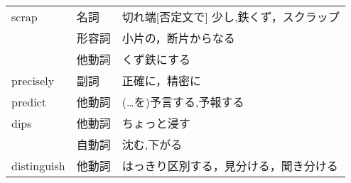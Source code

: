 \documentclass[fleqn,9pt,a4paper,dvipdfmx]{jsarticle}
\begin{document}
\begin{enumerate}
\begin{table}[h]
\begin{tabular}{l|ll}
  scrap                      & 名詞                             & 切れ端{[}否定文で{]} 少し,鉄くず，スクラップ     \\
                             & 形容詞                            & 小片の，断片からなる                    \\
                             & 他動詞                            & くず鉄にする                        \\ \hline
  precisely                  & 副詞                             & 正確に，精密に                        \\ \hline
  predict                    & 他動詞                            & (…を)予言する,予報する                  \\ \hline
  dips                       & 他動詞                            & ちょっと浸す                        \\
                             & 自動詞                            & 沈む,下がる                        \\ \hline
  distinguish                & 他動詞                            & はっきり区別する，見分ける，聞き分ける \\
  \end{tabular}
  \end{table}
\end{enumerate}
  
\end{document}
